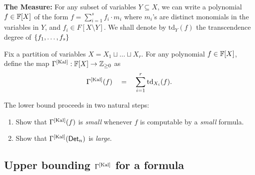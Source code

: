 {\bf The Measure:} 
For any subset of variables $Y\subseteq X$, we can write a polynomial $f \in \mathbb{F}[X]$ of the form $f = \sum_{i=1}^s f_i \cdot m_i$ where $m_i$'s are distinct monomials in the variables in $Y$, and $f_i \in F[X \setminus Y]$.
We shall denote by $\mathrm{td}_Y(f)$ the transcendence degree of $\left\{f_1,\dots, f_s\right\}$


Fix a partition of variables $X = X_1 \sqcup \dots \sqcup X_r$.
For any polynomial $f\in \mathbb{F}[X]$, define the map $\Gamma^{\mathrm{[Kal]}}:\mathbb{F}[X]\rightarrow \mathbb{Z}_{\geq 0}$ as
$$
\Gamma^{\mathrm{[Kal]}}(f) \quad=\quad \sum_{i=1}^r \mathrm{td}_{X_i}(f).
$$

The lower bound proceeds in two natural steps:
\begin{enumerate}
\item Show that $\Gamma^{\mathrm{[Kal]}}(f)$ is \emph{small} whenever $f$ is computable by a \emph{small} formula. 
\item Show that $\Gamma^{\mathrm{[Kal]}}(\operatorname{\mathsf{Det}}_n)$ is \emph{large}. 
\end{enumerate}

\subsection{Upper bounding $\Gamma^{\mathrm{[Kal]}}$ for a formula}


